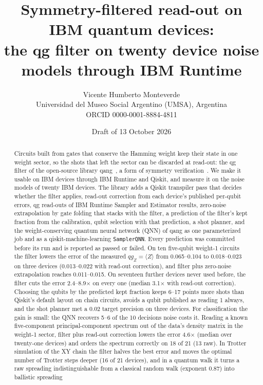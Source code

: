 \documentclass[11pt]{article}
\title{Symmetry-filtered read-out on IBM quantum devices:\\
the qg filter on twenty device noise models through IBM Runtime}
\author{Vicente Humberto Monteverde\\
\small Universidad del Museo Social Argentino (UMSA), Argentina\\
\small ORCID 0000-0001-8884-4811}
\date{\small Draft of 13 October 2026}
\newcommand{\qZ}{qg_Z}
\begin{document}
\sloppy
\maketitle

\begin{abstract}
Circuits built from gates that conserve the Hamming weight keep their state in one weight sector, so the
shots that left the sector can be discarded at read-out: the qg filter of the open-source library
qang~\cite{monteverde2026qang}, a form of symmetry verification~\cite{bonetmonroig2018,mcardle2019}. We
make it usable on IBM devices through IBM Runtime and Qiskit, and measure it on the noise models of twenty
IBM devices. The library adds a Qiskit transpiler pass that decides whether the filter applies, read-out
correction from each device's published per-qubit errors, qg read-outs of IBM Runtime Sampler and
Estimator results, zero-noise extrapolation by gate folding that stacks with the filter, a prediction of
the filter's kept fraction from the calibration, qubit selection with that prediction, a shot planner, and
the weight-conserving quantum neural network (QNN) of qang as one parameterized job and as a
qiskit-machine-learning \texttt{SamplerQNN}. Every prediction was committed before its run and is reported
as passed or failed. On ten five-qubit weight-1 circuits the filter lowers the error of the measured
$\qZ=\langle Z\rangle$ from 0.065--0.104 to 0.018--0.023 on three devices (0.013--0.022 with read-out correction), and filter plus zero-noise
extrapolation reaches 0.011--0.015. On seventeen further devices never used before, the filter cuts the
error 2.4--8.9$\times$ on every one (median 3.1$\times$ with read-out correction). Choosing the qubits by
the predicted kept fraction keeps 6--17 points more shots than Qiskit's default layout on chain circuits,
avoids a qubit published as reading 1 always, and the shot planner met a 0.02 target precision on three
devices. For classification the gain is small: the QNN recovers 5--6 of the 10 decisions noise costs it. Reading a
known five-component principal-component spectrum out of the data's density matrix in the weight-1 sector,
filter plus read-out correction lowers the error 4.6$\times$ (median over twenty-one devices) and orders the
spectrum correctly on 18 of 21 (13 raw). In Trotter simulation of the XY chain the filter halves the best
error and moves the optimal number of Trotter steps deeper (16 of 21 devices), and in a quantum walk it turns
a raw spreading indistinguishable from a classical random walk (exponent 0.87) into ballistic spreading

\end{abstract}
\end{document}
